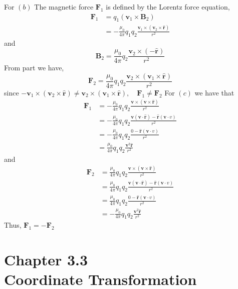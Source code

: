 \documentclass{styles/kaobook}
\begin{document}
For $(b)$ The magnetic force $\mathbf{F}_{1}$ is defined by the Lorentz force equation,
$$
\begin{aligned}
\mathbf{F}_{1} &=q_{1}\left(\mathbf{v}_{1} \times \mathbf{B}_{2}\right) \\
&=-\frac{\mu_{0}}{4 \pi} q_{1} q_{2} \frac{\mathbf{v}_{1} \times\left(\mathbf{v}_{2} \times \hat{\mathbf{r}}\right)}{r^{2}}
\end{aligned}
$$
and
$$
\mathbf{B}_{2}=\frac{\mu_{0}}{4 \pi} q_{2} \frac{\mathbf{v}_{2} \times(-\hat{\mathbf{r}})}{r^{2}}
$$
From part we have, 
$$ \mathbf{F}_{2}=\frac{\mu_{0}}{4 \pi} q_{1} q_{2} \frac{\mathbf{v}_{2} \times\left(\mathbf{v}_{1} \times \hat{\mathbf{r}}\right)}{r^{2}}$$
since $-\mathbf{v}_{1} \times\left(\mathbf{v}_{2} \times \hat{\mathbf{r}}\right) \neq \mathbf{v}_{2} \times\left(\mathbf{v}_{1} \times \hat{\mathbf{r}}\right), \quad \mathbf{F}_{1} \neq \mathbf{F}_{2}$
For $(c)$ we have that
$$
\begin{aligned}
\mathbf{F}_{1} &=-\frac{\mu_{0}}{4 \pi} q_{1} q_{2} \frac{\mathbf{v} \times(\mathbf{v} \times \hat{\mathbf{r}})}{r^{2}} \\
&=-\frac{\mu_{0}}{4 \pi} q_{1} q_{2} \frac{\mathbf{v}(\mathbf{v} \cdot \hat{\mathbf{r}})-\hat{\mathbf{r}}(\mathbf{v} \cdot v)}{r^{2}} \\
&=-\frac{\mu_{0}}{4 \pi} q_{1} q_{2} \frac{0-\hat{\mathbf{r}}(\mathbf{v} \cdot v)}{r^{2}} \\
&=\frac{\mu_{0}}{4 \pi} q_{1} q_{2} \frac{\mathbf{v}^{2} \hat{\mathbf{r}}}{r^{2}}
\end{aligned}
$$
and
$$
\begin{aligned}
\mathbf{F}_{2} &=\frac{\mu_{0}}{4 \pi} q_{1} q_{2} \frac{\mathbf{v} \times(\mathbf{v} \times \hat{\mathbf{r}})}{r^{2}} \\
&=\frac{\mu_{0}}{4 \pi} q_{1} q_{2} \frac{\mathbf{v}(\mathbf{v} \cdot \hat{\mathbf{r}})-\hat{\mathbf{r}}(\mathbf{v} \cdot v)}{r^{2}} \\
&=\frac{\mu_{0}}{4 \pi} q_{1} q_{2} \frac{0-\hat{\mathbf{r}}(\mathbf{v} \cdot v)}{r^{2}} \\
&=-\frac{\mu_{0}}{4 \pi} q_{1} q_{2} \frac{\mathbf{v}^{2} \hat{\mathbf{r}}}{r^{2}}
\end{aligned}
$$
Thus, $\mathbf{F}_1 = -\mathbf{F}_2$


\newpage


\chapter*{Chapter 3.3 \\ Coordinate Transformation}
\end{document}
